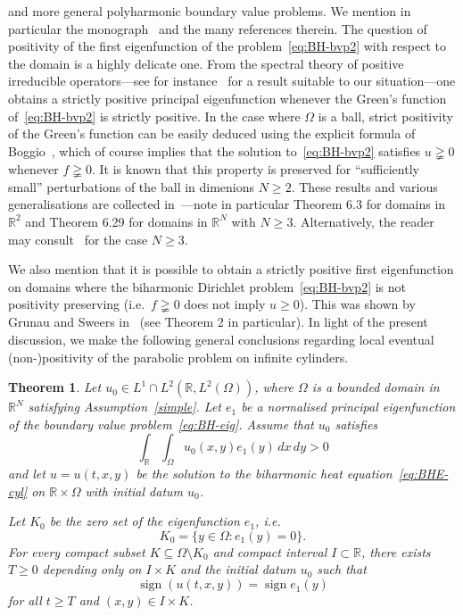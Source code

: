 \documentclass[a4paper, reqno,titlepage]{amsart}
\numberwithin{equation}{section}
\theoremstyle{plain}
\newtheorem{theorem}{Theorem}[section]
\theoremstyle{definition}
\theoremstyle{remark}
\DeclareMathOperator{\sgn}{sign}
\newcommand{\RR}{\mathbb{R}}
\begin{document}
and more general polyharmonic boundary value problems. We mention in particular the monograph~\cite{GGS} and the many references therein. The question of positivity of the first eigenfunction of the problem~\eqref{eq:BH-bvp2} with respect to the domain is a highly delicate one. From the spectral theory of positive irreducible operators---see for instance~\cite[Theorem 43.8]{Zaa} for a result suitable to our situation---one obtains a strictly positive principal eigenfunction whenever the Green's function of~\eqref{eq:BH-bvp2} is strictly positive. In the case where $\Omega$ is a ball, strict positivity of the Green's function can be easily deduced using the explicit formula of Boggio~\cite[Section 4.1]{GGS}, which of course implies that the solution to~\eqref{eq:BH-bvp2} satisfies $u \gneqq 0$ whenever $f \gneqq 0$. It is known that this property is preserved for ``sufficiently small'' perturbations of the ball in dimenions $N \geq 2$. These results and various generalisations are collected in~\cite[Chapter~6]{GGS}---note in particular Theorem 6.3 for domains in $\RR^2$ and Theorem 6.29 for domains in $\RR^N$ with $N \geq 3$. Alternatively, the reader may consult~\cite[Theorem 2]{GR10} for the case $N \geq 3$.

We also mention that it is possible to obtain a strictly positive first eigenfunction on domains where the biharmonic Dirichlet problem~\eqref{eq:BH-bvp2} is not positivity preserving (i.e.\ $f \gneqq 0$ does not imply $u \geq 0$). This was shown by Grunau and Sweers in~\cite{GS99} (see Theorem 2 in particular). In light of the present discussion, we make the following general conclusions regarding local eventual (non-)positivity of the parabolic problem on infinite cylinders.

\begin{theorem}
  \label{thm:LEP-cyl}
  Let $u_0 \in L^1 \cap L^2(\RR, L^2(\Omega))$, where $\Omega$ is a bounded domain in $\RR^N$ satisfying Assumption~\ref{simple}. Let $e_1$ be a normalised principal eigenfunction of the boundary value problem~\eqref{eq:BH-eig}. Assume that $u_0$ satisfies
  \begin{equation}
    \label{eq:u0-pos-mass-cyl}
    \int_\RR \int_\Omega u_0(x,y) e_1(y) \,dx \,dy > 0
  \end{equation}
  and let $u = u(t, x, y)$ be the solution to the biharmonic heat equation~\eqref{eq:BHE-cyl} on $\RR \times \Omega$ with initial datum $u_0$.

  Let $K_0$ be the zero set of the eigenfunction $e_1$, i.e.
  \begin{equation*}
    K_0 = \{ y \in \Omega\colon e_1(y) = 0 \}.
  \end{equation*}
  For every compact subset $K \subseteq \Omega \setminus K_0$ and compact interval $I \subset \RR$, there exists $T \geq 0$ depending only on $I \times K$ and the initial datum $u_0$ such that
  \begin{equation}
    \label{eq:LEP-cyl}
    \sgn(u(t,x,y)) = \sgn e_1(y)
  \end{equation}
  for all $t \geq T$ and $(x,y) \in I \times K$.
\end{theorem}
\end{document}
